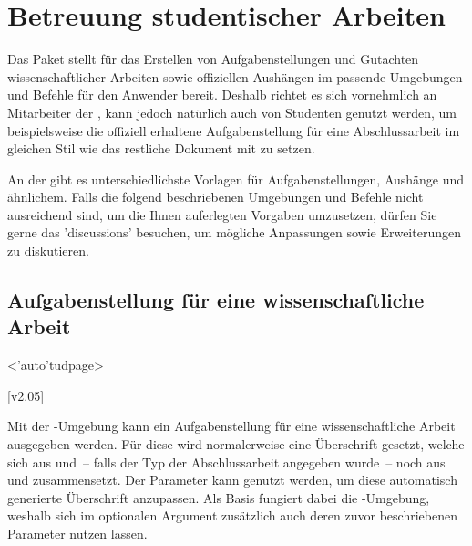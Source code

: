 \chapter[%
  Das Paket \Package{tudscrsupervisor} -- Studentische Betreuung%
]{%
  Betreuung studentischer Arbeiten%
}

\begin{DeclareEntity}{}
Das Paket  stellt für das Erstellen von 
Aufgabenstellungen und Gutachten wissenschaftlicher Arbeiten sowie offiziellen 
Aushängen im \CD passende Umgebungen und Befehle für den Anwender bereit. 
Deshalb richtet es sich vornehmlich an Mitarbeiter der \TnUD, kann jedoch 
natürlich auch von Studenten genutzt werden, um beispielsweise die offiziell 
erhaltene Aufgabenstellung für eine Abschlussarbeit im gleichen Stil wie das 
restliche Dokument mit  zu setzen.

An der \TUD gibt es unterschiedlichste Vorlagen für Aufgabenstellungen, 
Aushänge und ähnlichem. Falls die folgend beschriebenen Umgebungen und Befehle 
nicht ausreichend sind, um die Ihnen auferlegten Vorgaben umzusetzen, dürfen 
Sie gerne das \GitHubRepo'discussions' besuchen, um mögliche Anpassungen sowie 
Erweiterungen zu diskutieren.



\section{%
  Aufgabenstellung für eine wissenschaftliche Arbeit%
}

\begin{Declaration}
  {}
  <\Environment'auto'{tudpage}>
\begin{Declaration}
  {}
\begin{Declaration}
  {}
  [v2.05]
\printdeclarationlist

Mit der -Umgebung kann ein Aufgabenstellung für eine 
wissenschaftliche Arbeit ausgegeben werden. Für diese wird normalerweise eine 
Überschrift gesetzt, welche sich aus  und~-- falls der Typ der 
Abschlussarbeit angegeben wurde~-- noch aus  und  
zusammensetzt. Der Parameter  kann genutzt werden, 
um diese automatisch generierte Überschrift anzupassen. Als Basis fungiert 
dabei die -Umgebung, weshalb sich im optionalen Argument 
zusätzlich auch deren zuvor beschriebenen Parameter nutzen lassen.


\end{Declaration}
\end{Declaration}
\end{Declaration}
\end{DeclareEntity}
